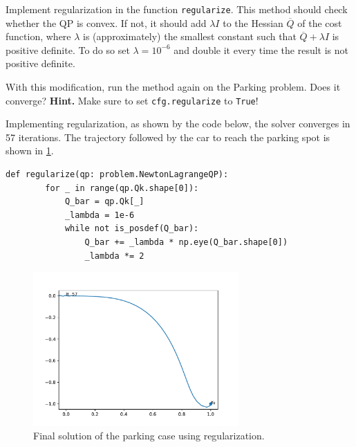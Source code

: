\documentclass[]{article}
\begin{document}
\begin{assignment}
	Implement regularization in the function \texttt{regularize}. This method should 
	check whether the QP is convex. 
	If not, it should add $\lambda I$ to the Hessian $\overline{Q}$ of the cost function, where $\lambda$ is 
	(approximately) the smallest constant such that $\overline{Q} + \lambda I$ is positive definite.
	To do so set $\lambda = 10^{-6}$ and double it every time the result is not positive definite. 
	
	With this modification, run the method again on the Parking problem. Does it converge? 
	\textbf{Hint.}  Make sure to set \texttt{cfg.regularize} to \texttt{True}!
\end{assignment}
\begin{flushleft}
	Implementing regularization, as shown by the code below, the solver converges in 57 iterations. 
	The trajectory followed by the car to reach the parking spot is shown in \ref{fig:assignment65-parking}.
\end{flushleft}
\begin{lstlisting}[style=python]
	def regularize(qp: problem.NewtonLagrangeQP):
		for _ in range(qp.Qk.shape[0]):
			Q_bar = qp.Qk[_]
			_lambda = 1e-6
			while not is_posdef(Q_bar):
				Q_bar += _lambda * np.eye(Q_bar.shape[0])
				_lambda *= 2
\end{lstlisting}
\begin{figure}[H]
	\centering
	\includegraphics[width=0.7\textwidth]{images/parking_regularize-True-maxiter70.pdf}
	\caption{Final solution of the parking case using regularization.}
	\label{fig:assignment65-parking}
\end{figure}


 
\end{document}
